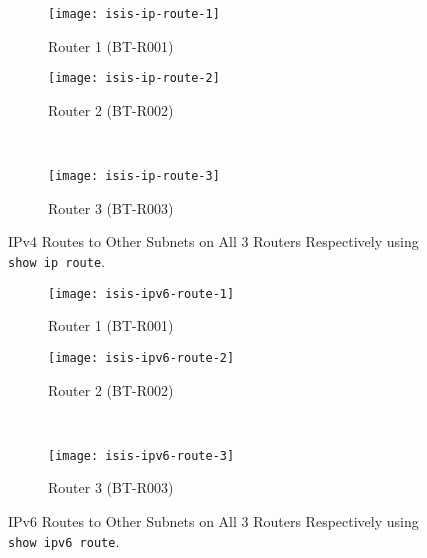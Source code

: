 \begin{figure*}[ht!]
    \centering
    \begin{subfigure}[b]{0.67\textwidth}
        \centering
        \texttt{[image: isis-ip-route-1]}
        \caption{Router 1 (BT-R001)}
    \end{subfigure}
    \hfill
    \begin{minipage}[b]{0.3\textwidth}
	    \begin{subfigure}[b]{\linewidth}
	        \centering
	        \texttt{[image: isis-ip-route-2]}
	        \caption{Router 2 (BT-R002)}
	    \end{subfigure}
	    \\
	    \begin{subfigure}[b]{\linewidth}
	        \centering
	        \texttt{[image: isis-ip-route-3]}
	        \caption{Router 3 (BT-R003)}
	    \end{subfigure}
	\end{minipage}
    \caption{IPv4 Routes to Other Subnets on All $3$ Routers Respectively using \texttt{show ip route}.}
    \label{fig:isis-ip-route}
\end{figure*}


\begin{figure*}[ht!]
    \centering
    \begin{subfigure}[b]{0.67\textwidth}
        \centering
        \texttt{[image: isis-ipv6-route-1]}
        \caption{Router 1 (BT-R001)}
    \end{subfigure}
    \hfill
    \begin{minipage}[b]{0.3\textwidth}
	    \begin{subfigure}[b]{\linewidth}
	        \centering
	        \texttt{[image: isis-ipv6-route-2]}
	        \caption{Router 2 (BT-R002)}
	    \end{subfigure}
	    \\
	    \begin{subfigure}[b]{\linewidth}
	        \centering
	        \texttt{[image: isis-ipv6-route-3]}
	        \caption{Router 3 (BT-R003)}
	    \end{subfigure}
	\end{minipage}
    \caption{IPv6 Routes to Other Subnets on All $3$ Routers Respectively using \texttt{show ipv6 route}.}
    \label{fig:isis-ipv6-route}
\end{figure*}

\clearpage

